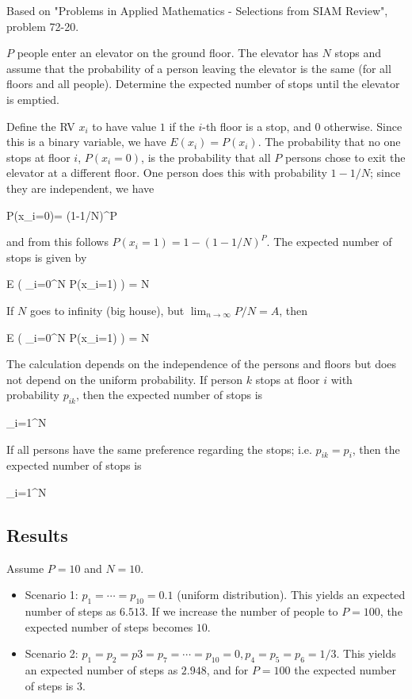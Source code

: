 
Based on "Problems in Applied Mathematics - Selections from SIAM Review", problem 72-20.

$P$ people enter an elevator on the ground floor. The elevator has $N$ stops and assume that the probability of a person leaving the elevator is the same (for all floors and all people). Determine the expected number of stops until the elevator is emptied.

Define the RV $x_i$ to have value $1$ if the $i$-th floor is a stop, and $0$ otherwise. Since this is a binary variable, we have $E(x_i) = P(x_i)$. The probability that no one stops at floor $i$, $P(x_i=0)$, is the probability that all $P$ persons chose to exit the elevator at a different floor. One person does this with probability $1-1/N$; since they are independent, we have

\bee
P(x_i=0)= (1-1/N)^P
\eee

and from this follows $P(x_i=1)= 1-(1-1/N)^P$. The expected number of stops is given by

\bee
E \left( \sum_{i=0}^N P(x_i=1) \right) = N \left[ 1-(1-1/N)^P \right]
\eee

If $N$ goes to infinity (big house), but $\lim_{n \rightarrow \infty} P/N = A$, then

\bee
E \left( \sum_{i=0}^N P(x_i=1) \right) = N \left[ 1-e^{-A} \right]
\eee

The calculation depends on the independence of the persons and floors but does not depend on the uniform probability. If person $k$ stops at floor $i$ with probability $p_{ik}$, then the expected number of stops is

\bee
\sum_{i=1}^N \left[ 1-\prod_{k=1}^P (1-p_{ik}) \right]
\eee

If all persons have the same preference regarding the stops; i.e. $p_{ik} = p_i$, then the expected number of stops is

\bee
\sum_{i=1}^N \left[ 1- (1-p_{i})^P \right]
\eee

\subsection{Results}

Assume $P=10$ and $N = 10$.

\begin{itemize}
	\item Scenario 1: $p_1 = \cdots = p_{10} = 0.1$ (uniform distribution). This yields an expected number of steps as $6.513$. If we increase the number of people to $P=100$, the expected number of steps becomes $10$.
	
	\item Scenario 2: $p_1 = p_2 = p3 = p_7 = \cdots= p_{10} = 0, p_4 = p_5 = p_6 = 1/3$. This yields an expected number of steps as $2.948$, and for $P=100$ the expected number of steps is $3$.
\end{itemize}


